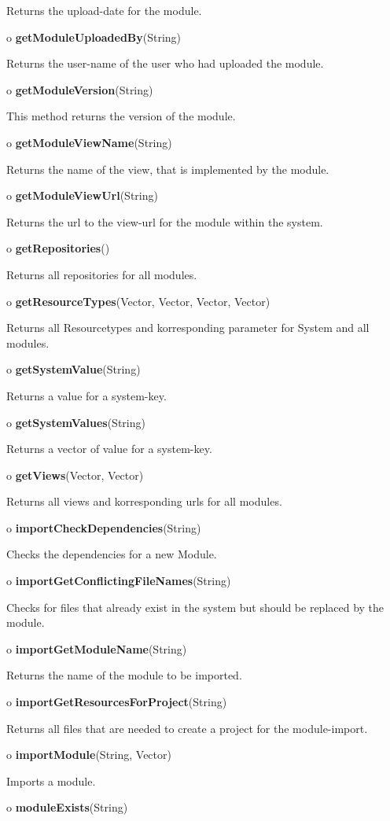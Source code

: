 \begin{description}
Returns the upload-date for the module.  
\item o {\bf getModuleUploadedBy}(String)  

Returns the user-name of the user who had uploaded the module.  
\item o {\bf getModuleVersion}(String)  

This method returns the version of the module.  
\item o {\bf getModuleViewName}(String)  

Returns the name of the view, that is implemented by the module.  
\item o {\bf getModuleViewUrl}(String)  

Returns the url to the view-url for the module within the system.  
\item o {\bf getRepositories}()  

Returns all repositories for all modules.  
\item o {\bf getResourceTypes}(Vector, Vector, Vector, Vector)  

Returns all Resourcetypes and korresponding parameter for System and all
modules.  
\item o {\bf getSystemValue}(String)  

Returns a value for a system-key.  
\item o {\bf getSystemValues}(String)  

Returns a vector of value for a system-key.  
\item o {\bf getViews}(Vector, Vector)  

Returns all views and korresponding urls for all modules.  
\item o {\bf importCheckDependencies}(String)  

Checks the dependencies for a new Module.  
\item o {\bf importGetConflictingFileNames}(String)  

Checks for files that already exist in the system but should be replaced by
the module.  
\item o {\bf importGetModuleName}(String)  

Returns the name of the module to be imported.  
\item o {\bf importGetResourcesForProject}(String)  

Returns all files that are needed to create a project for the module-import.  
\item o {\bf importModule}(String, Vector)  

Imports a module.  
\item o {\bf moduleExists}(String)  


\end{description}
